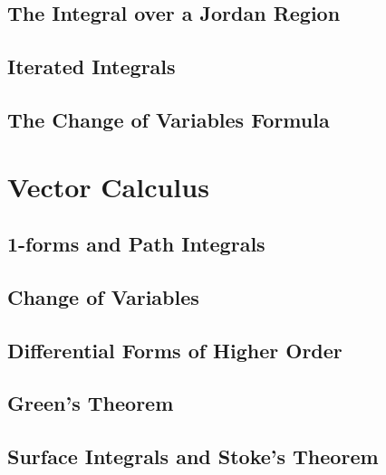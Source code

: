 \documentclass[12pt]{book}
\begin{document}
\section{The Integral over a Jordan Region}


\section{Iterated Integrals}

\section{The Change of Variables Formula}




\chapter{Vector Calculus}
\section{1-forms and Path Integrals}


\section{Change of Variables}


\section{Differential Forms of Higher Order}


\section{Green's Theorem}


\section{Surface Integrals and Stoke's Theorem}
\end{document}
